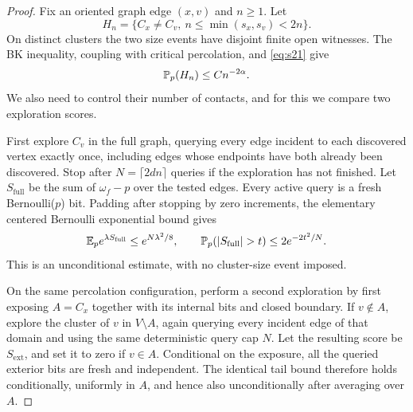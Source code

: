 \begin{proof}
Fix an oriented graph edge $(x,v)$ and $n\ge1$.  Let
\[
 H_n=\{C_x\ne C_v,\ n\le\min(s_x,s_v)<2n\}.
\]
On distinct clusters the two size events have disjoint finite open
witnesses.  The BK inequality, coupling with critical percolation,
and \eqref{eq:s21} give
\begin{equation}
 \mathbb P_p(H_n)\le C n^{-2\alpha}.
 \label{trace:two-large-clusters}
\end{equation}
We also need to control their number of contacts, and for this we
compare two exploration scores.

First explore $C_v$ in the full graph, querying every edge incident
to each discovered vertex exactly once, including edges whose
endpoints have both already been discovered.  Stop after
$N=\lceil2dn\rceil$ queries if the exploration has not finished.
Let $S_{\mathrm{full}}$ be the sum of $\omega_f-p$ over the tested
edges.  Every active query is a fresh Bernoulli($p$) bit.  Padding
after stopping by zero increments, the elementary centered
Bernoulli exponential bound gives
\[
 \mathbb E_p e^{\lambda S_{\mathrm{full}}}\le e^{N\lambda^2/8},
 \qquad
 \mathbb P_p(\lvert S_{\mathrm{full}}\rvert>t)
                       \le2e^{-2t^2/N}.
\]
This is an unconditional estimate, with no cluster-size event
imposed.

On the same percolation configuration, perform a second exploration
by first exposing $A=C_x$ together with its internal bits and
closed boundary.  If $v\notin A$, explore the cluster of $v$ in
$V\setminus A$, again querying every incident edge of that domain
and using the same deterministic query cap $N$.  Let the resulting
score be $S_{\mathrm{ext}}$, and set it to zero if $v\in A$.
Conditional on the exposure, all the queried exterior bits are
fresh and independent.  The identical tail bound therefore holds
conditionally, uniformly in $A$, and hence also unconditionally
after averaging over $A$.


\end{proof}
